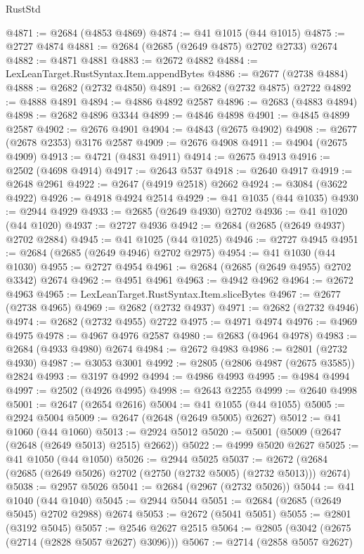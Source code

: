 \begin{lexlean}{RustStd}
\begin{coremodule}
@4871 := @2684 (@4853 @4869)
@4874 := @41 @1015 (@44 @1015)
@4875 := @2727 @4874
@4881 := @2684 (@2685 (@2649 @4875) @2702 @2733) @2674
@4882 := @4871 @4881
@4883 := @2672 @4882
@4884 := LexLeanTarget.RustSyntax.Item.appendBytes
@4886 := @2677 (@2738 @4884)
@4888 := @2682 (@2732 @4850)
@4891 := @2682 (@2732 @4875) @2722
@4892 := @4888 @4891
@4894 := @4886 @4892 @2587
@4896 := @2683 (@4883 @4894)
@4898 := @2682 @4896 @3344
@4899 := @4846 @4898
@4901 := @4845 @4899 @2587
@4902 := @2676 @4901
@4904 := @4843 (@2675 @4902)
@4908 := @2677 (@2678 @2353) @3176 @2587
@4909 := @2676 @4908
@4911 := @4904 (@2675 @4909)
@4913 := @4721 (@4831 @4911)
@4914 := @2675 @4913
@4916 := @2502 (@4698 @4914)
@4917 := @2643 @537
@4918 := @2640 @4917
@4919 := @2648 @2961
@4922 := @2647 (@4919 @2518) @2662
@4924 := @3084 (@3622 @4922)
@4926 := @4918 @4924 @2514
@4929 := @41 @1035 (@44 @1035)
@4930 := @2944 @4929
@4933 := @2685 (@2649 @4930) @2702
@4936 := @41 @1020 (@44 @1020)
@4937 := @2727 @4936
@4942 := @2684 (@2685 (@2649 @4937) @2702 @2884)
@4945 := @41 @1025 (@44 @1025)
@4946 := @2727 @4945
@4951 := @2684 (@2685 (@2649 @4946) @2702 @2975)
@4954 := @41 @1030 (@44 @1030)
@4955 := @2727 @4954
@4961 := @2684 (@2685 (@2649 @4955) @2702 @3342) @2674
@4962 := @4951 @4961
@4963 := @4942 @4962
@4964 := @2672 @4963
@4965 := LexLeanTarget.RustSyntax.Item.sliceBytes
@4967 := @2677 (@2738 @4965)
@4969 := @2682 (@2732 @4937)
@4971 := @2682 (@2732 @4946)
@4974 := @2682 (@2732 @4955) @2722
@4975 := @4971 @4974
@4976 := @4969 @4975
@4978 := @4967 @4976 @2587
@4980 := @2683 (@4964 @4978)
@4983 := @2684 (@4933 @4980) @2674
@4984 := @2672 @4983
@4986 := @2801 (@2732 @4930)
@4987 := @3053 @3001
@4992 := @2805 (@2806 @4987 (@2675 @3585)) @2824
@4993 := @3197 @4992
@4994 := @4986 @4993
@4995 := @4984 @4994
@4997 := @2502 (@4926 @4995)
@4998 := @2643 @2255
@4999 := @2640 @4998
@5001 := @2647 (@2654 @2616)
@5004 := @41 @1055 (@44 @1055)
@5005 := @2924 @5004
@5009 := @2647 (@2648 (@2649 @5005) @2627)
@5012 := @41 @1060 (@44 @1060)
@5013 := @2924 @5012
@5020 := @5001 (@5009 (@2647 (@2648 (@2649 @5013) @2515) @2662))
@5022 := @4999 @5020 @2627
@5025 := @41 @1050 (@44 @1050)
@5026 := @2944 @5025
@5037 := @2672 (@2684 (@2685 (@2649 @5026) @2702 (@2750 (@2732 @5005) (@2732 @5013))) @2674)
@5038 := @2957 @5026
@5041 := @2684 (@2967 (@2732 @5026))
@5044 := @41 @1040 (@44 @1040)
@5045 := @2944 @5044
@5051 := @2684 (@2685 (@2649 @5045) @2702 @2988) @2674
@5053 := @2672 (@5041 @5051)
@5055 := @2801 (@3192 @5045)
@5057 := @2546 @2627 @2515
@5064 := @2805 (@3042 (@2675 (@2714 (@2828 @5057 @2627) @3096)))
@5067 := @2714 (@2858 @5057 @2627)

\end{coremodule}
\end{lexlean}

